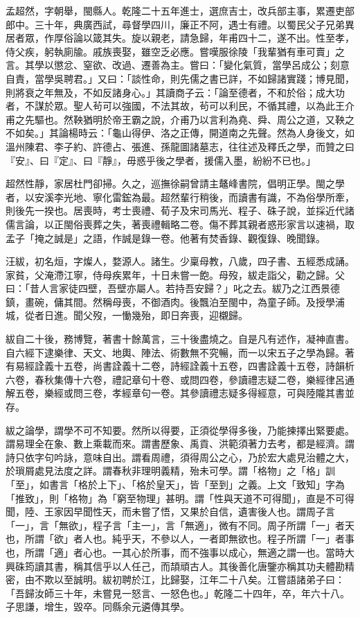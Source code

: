 \begin{pinyinscope}
孟超然，字朝舉，閩縣人。乾隆二十五年進士，選庶吉士，改兵部主事，累遷吏部郎中。三十年，典廣西試，尋督學四川，廉正不阿，遇士有禮。以蜀民父子兄弟異居者眾，作厚俗論以箴其失。旋以親老，請急歸，年甫四十二，遂不出。性至孝，侍父疾，躬執廁牏。戚族喪娶，雖空乏必應。嘗嘆服徐陵「我輩猶有車可賣」之言。其學以懲忿、窒欲、改過、遷善為主。嘗曰：「變化氣質，當學呂成公；刻意自責，當學吳聘君。」又曰：「談性命，則先儒之書已詳，不如歸諸實踐；博見聞，則將衰之年無及，不如反諸身心。」其讀商子云：「論至德者，不和於俗；成大功者，不謀於眾。聖人茍可以強國，不法其故，茍可以利民，不循其禮，以為此王介甫之先驅也。然鞅猶明於帝王霸之說，介甫乃以言利為堯、舜、周公之道，又鞅之不如矣。」其論楊時云：「龜山得伊、洛之正傳，開道南之先聲。然為人身後文，如溫州陳君、李子約、許德占、張進、孫龍圖諸墓志，往往述及釋氏之學，而贊之曰『安』、曰『定』、曰『靜』，毋惑乎後之學者，援儒入墨，紛紛不已也。」

超然性靜，家居杜門卻掃。久之，巡撫徐嗣曾請主鼇峰書院，倡明正學。閩之學者，以安溪李光地、寧化雷鋐為最。超然輩行稍後，而讀書有識，不為俗學所牽，則後先一揆也。居喪時，考士喪禮、荀子及宋司馬光、程子、硃子說，並採近代諸儒言論，以正閩俗喪葬之失，著喪禮輯略二卷。傷不葬其親者惑形家言以速禍，取孟子「掩之誠是」之語，作誠是錄一卷。他著有焚香錄、觀復錄、晚聞錄。

汪紱，初名烜，字燦人，婺源人。諸生。少稟母教，八歲，四子書、五經悉成誦。家貧，父淹滯江寧，侍母疾累年，十日未嘗一飽。母歿，紱走詣父，勸之歸。父曰：「昔人言家徒四壁，吾壁亦屬人。若持吾安歸？」叱之去。紱乃之江西景德鎮，畫碗，傭其間。然稱母喪，不御酒肉。後飄泊至閩中，為童子師。及授學浦城，從者日進。聞父歿，一慟幾殆，即日奔喪，迎櫬歸。

紱自二十後，務博覽，著書十餘萬言，三十後盡燒之。自是凡有述作，凝神直書。自六經下逮樂律、天文、地輿、陣法、術數無不究暢，而一以宋五子之學為歸。著有易經詮義十五卷，尚書詮義十二卷，詩經詮義十五卷，四書詮義十五卷，詩韻析六卷，春秋集傳十六卷，禮記章句十卷、或問四卷，參讀禮志疑二卷，樂經律呂通解五卷，樂經或問三卷，孝經章句一卷。其參讀禮志疑多得經意，可與陸隴其書並存。

紱之論學，謂學不可不知要。然所以得要，正須從學得多後，乃能揀擇出緊要處。謂易理全在象、數上乘載而來。謂書歷象、禹貢、洪範須著力去考，都是經濟。謂詩只依字句吟詠，意味自出。謂看周禮，須得周公之心，乃於宏大處見治體之大，於瑣屑處見法度之詳。謂春秋非理明義精，殆未可學。謂「格物」之「格」訓「至」，如書言「格於上下」、「格於皇天」，皆「至到」之義。上文「致知」字為「推致」，則「格物」為「窮至物理」甚明。謂「性與天道不可得聞」，直是不可得聞，陸、王家因早聞性天，而未嘗了悟，又果於自信，遺害後人也。謂周子言「一」，言「無欲」，程子言「主一」，言「無適」，微有不同。周子所謂「一」者天也，所謂「欲」者人也。純乎天，不參以人，一者即無欲也。程子所謂「一」者事也，所謂「適」者心也。一其心於所事，而不強事以成心，無適之謂一也。當時大興硃筠讀其書，稱其信乎以人任己，而頡頑古人。其後善化唐鑒亦稱其功夫體勘精密，由不欺以至誠明。紱初聘於江，比歸娶，江年二十八矣。江嘗語諸弟子曰：「吾歸汝師三十年，未嘗見一怒言、一怒色也。」乾隆二十四年，卒，年六十八。子思謙，增生，毀卒。同縣余元遴傳其學。


\end{pinyinscope}
